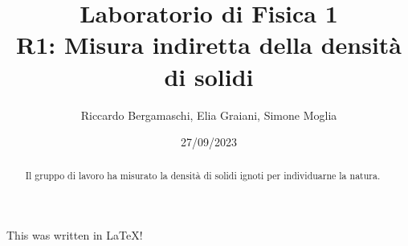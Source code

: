 \documentclass{article}
\title{
    Laboratorio di Fisica 1\\
    R1: Misura indiretta della densità di solidi
}
\author{Riccardo Bergamaschi, Elia Graiani, Simone Moglia}
\date{27/09/2023}
\begin{document}
\maketitle
\begin{abstract}
    Il gruppo di lavoro ha misurato la densità di solidi ignoti
    per individuarne la natura.
\end{abstract}
This was written in \LaTeX !
\end{document}
